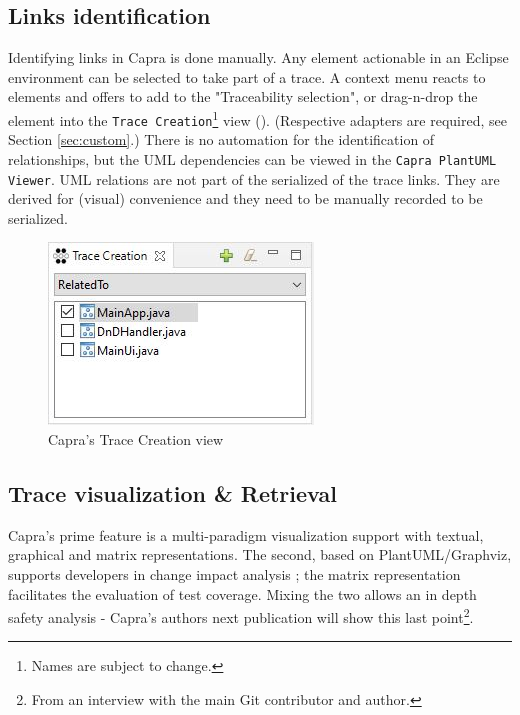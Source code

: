 \subsection{Links identification}\label{sec:identification}
Identifying links in Capra is done manually. Any element actionable in an Eclipse environment can be selected to take part of a trace. A context menu reacts to elements and offers to add to the "Traceability selection", or drag-n-drop the element into the \texttt{Trace Creation}\footnote{Names are subject to change.} view (). (Respective adapters are required, see Section \ref{sec:custom}.)
There is no automation for the identification of relationships, but the UML dependencies can be viewed in the \texttt{Capra PlantUML Viewer}. UML relations are not part of the serialized of the trace links. They are derived for (visual) convenience and they need to be manually recorded to be serialized.

\begin{figure}[h] 
	\centering
	\includegraphics[width=.35\linewidth]{images/tracecreationview.JPG}
	\caption{Capra's Trace Creation view}
	\label{fig:tracecreation}
\end{figure}

\subsection{Trace visualization \& Retrieval}\label{sec:visualization}
Capra's prime feature is a multi-paradigm visualization support with textual, graphical and matrix representations. 
The second, based on PlantUML/Graphviz, supports developers in change impact analysis ; the matrix representation facilitates the evaluation of test coverage. Mixing the two allows an in depth safety analysis - Capra's authors next publication will show this last point\footnote{From an interview with the main Git contributor and author.}. 
	
